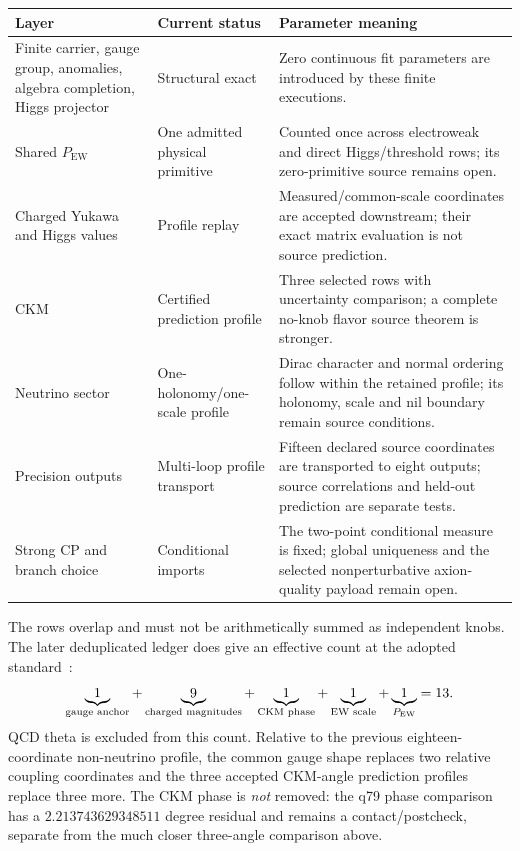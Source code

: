 \documentclass[11pt]{article}
\begin{document}
\begin{center}
\begin{tabularx}{0.96\textwidth}{@{}L{0.23\textwidth}L{0.18\textwidth}Y@{}}
\toprule
Layer & Current status & Parameter meaning \\
\midrule
Finite carrier, gauge group, anomalies, algebra completion, Higgs projector & Structural exact
& Zero continuous fit parameters are introduced by these finite executions. \\
Shared $P_{\mathrm{EW}}$ & One admitted physical primitive & Counted once across electroweak and
direct Higgs/threshold rows; its zero-primitive source remains open. \\
Charged Yukawa and Higgs values & Profile replay & Measured/common-scale coordinates are accepted
downstream; their exact matrix evaluation is not source prediction. \\
CKM & Certified prediction profile & Three selected rows with uncertainty comparison; a complete
no-knob flavor source theorem is stronger. \\
Neutrino sector & One-holonomy/one-scale profile & Dirac character and normal ordering follow
within the retained profile; its holonomy, scale and nil boundary remain source conditions. \\
Precision outputs & Multi-loop profile transport & Fifteen declared source coordinates are
transported to eight outputs; source correlations and held-out prediction are separate tests. \\
Strong CP and branch choice & Conditional imports & The two-point conditional measure is fixed;
global uniqueness and the selected nonperturbative axion-quality payload remain open. \\
\bottomrule
\end{tabularx}
\end{center}

The rows overlap and must not be arithmetically summed as independent knobs.  The later
deduplicated ledger does give an effective count at the adopted standard~\cite{SMParameterLedger}:
\begin{equation}
\underbrace{1}_{\text{gauge anchor}}+
\underbrace{9}_{\text{charged magnitudes}}+
\underbrace{1}_{\text{CKM phase}}+
\underbrace{1}_{\text{EW scale}}+
\underbrace{1}_{P_{\rm EW}}=13.
\end{equation}
QCD theta is excluded from this count.  Relative to the previous eighteen-coordinate
non-neutrino profile, the common gauge shape replaces two relative coupling coordinates and
the three accepted CKM-angle prediction profiles replace three more.  The CKM phase is
\emph{not} removed: the q79 phase comparison has a $2.213743629348511$ degree residual and
remains a contact/postcheck, separate from the much closer three-angle comparison above.
\end{document}

